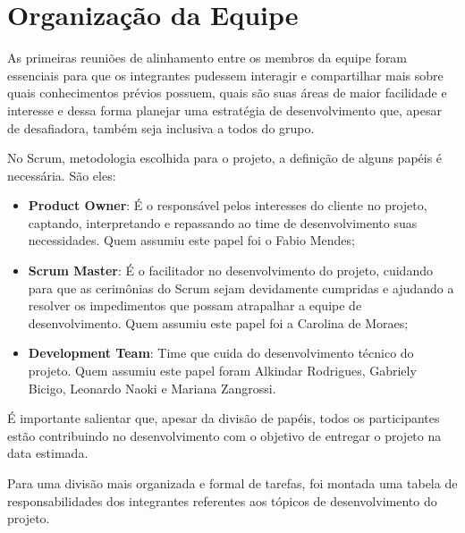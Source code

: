 \section{Organização da Equipe}
As primeiras reuniões de alinhamento entre os membros da equipe foram essenciais para que os integrantes pudessem interagir e compartilhar mais sobre quais conhecimentos prévios possuem, quais são suas áreas de maior facilidade e interesse e dessa forma planejar uma estratégia de desenvolvimento que, apesar de desafiadora, também seja inclusiva a todos do grupo. 

No Scrum, metodologia escolhida para o projeto, a definição de alguns papéis é necessária. São eles: 

\begin {itemize}
\item \textbf{Product Owner}: É o responsável pelos interesses do cliente no projeto, captando, interpretando e repassando ao time de desenvolvimento suas necessidades. Quem assumiu este papel foi o Fabio Mendes;

\item \textbf{Scrum Master}: É o facilitador no desenvolvimento do projeto, cuidando para que as cerimônias do Scrum sejam devidamente cumpridas e ajudando a resolver os impedimentos que possam atrapalhar a equipe de desenvolvimento. Quem assumiu este papel foi a Carolina de Moraes;

\item \textbf{Development Team}: Time que cuida do desenvolvimento técnico do projeto. Quem assumiu este papel foram Alkindar Rodrigues, Gabriely Bicigo, Leonardo Naoki e Mariana Zangrossi.

\end {itemize}

É importante salientar que, apesar da divisão de papéis, todos os participantes estão contribuindo no desenvolvimento com o objetivo de entregar o projeto na data estimada.

Para uma divisão mais organizada e formal de tarefas, foi montada uma tabela de responsabilidades dos integrantes referentes aos tópicos de desenvolvimento do projeto.

